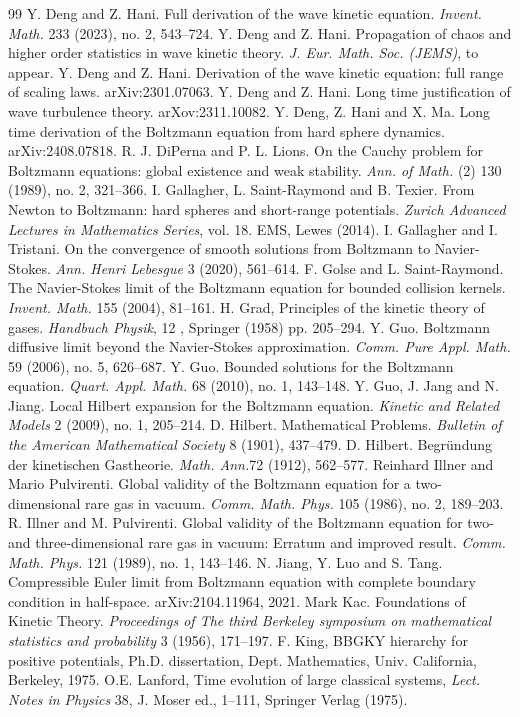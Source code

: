 \documentclass[10pt, reqno]{amsart}
\theoremstyle{definition}
\theoremstyle{remark}
\numberwithin{equation}{section}
\begin{document}
\begin{thebibliography}{99}
 Y. Deng and Z. Hani. Full derivation of the wave kinetic equation. \emph{Invent. Math.} 233 (2023), no. 2, 543--724.
 Y. Deng and Z. Hani. Propagation of chaos and higher order statistics in wave kinetic theory. \emph{J. Eur. Math. Soc. (JEMS)}, to appear.
 Y. Deng and Z. Hani. Derivation of the wave kinetic equation: full range of scaling laws. arXiv:2301.07063.
 Y. Deng and Z. Hani. Long time justification of wave turbulence theory. arXov:2311.10082.
 Y. Deng, Z. Hani and X. Ma. Long time derivation of the Boltzmann equation from hard sphere dynamics. arXiv:2408.07818.
 R. J. DiPerna and P. L. Lions. On the Cauchy problem for Boltzmann equations: global existence and weak stability. \emph{Ann. of Math.} (2) 130 (1989), no. 2, 321--366.
 I. Gallagher, L. Saint-Raymond and B. Texier. From Newton to Boltzmann: hard spheres and short-range potentials. \emph{Zurich Advanced Lectures in Mathematics Series}, vol. 18. EMS, Lewes (2014).
 I. Gallagher and I. Tristani. On the convergence of smooth solutions from Boltzmann to Navier-Stokes. \emph{Ann. Henri Lebesgue} 3 (2020), 561--614.
 F. Golse and L. Saint-Raymond. The Navier-Stokes limit of the Boltzmann equation for bounded collision kernels. \emph{Invent. Math.} 155 (2004), 81--161.
 H. Grad, Principles of the kinetic theory of gases. \emph{Handbuch Physik}, 12 , Springer (1958) pp. 205--294.
 Y. Guo. Boltzmann diffusive limit beyond the Navier-Stokes approximation. \emph{Comm. Pure Appl. Math.} 59 (2006), no. 5, 626--687.
 Y. Guo. Bounded solutions for the Boltzmann equation. \emph{Quart. Appl. Math.} 68 (2010), no. 1, 143--148.
 Y. Guo, J. Jang and N. Jiang. Local Hilbert expansion for the Boltzmann equation. \emph{Kinetic and Related Models} 2 (2009), no. 1, 205--214.
 D. Hilbert. Mathematical Problems. \emph{Bulletin of the American Mathematical Society} 8 (1901), 437--479.
 D. Hilbert. Begr\"undung der kinetischen Gastheorie.\emph{ Math. Ann.}72 (1912), 562--577.
 Reinhard Illner and Mario Pulvirenti. Global validity of the Boltzmann equation for a two-dimensional rare gas in vacuum. \emph{Comm. Math. Phys.} 105 (1986), no. 2, 189--203.
 R. Illner and M. Pulvirenti. Global validity of the Boltzmann equation for two- and three-dimensional rare gas in vacuum: Erratum and improved result. \emph{Comm. Math. Phys.} 121 (1989), no. 1, 143--146.
 N. Jiang, Y. Luo and S. Tang. Compressible Euler limit from Boltzmann equation with complete boundary condition in half-space. arXiv:2104.11964, 2021.
 Mark Kac. Foundations of Kinetic Theory. \emph{Proceedings of The third Berkeley symposium on mathematical statistics and probability} 3 (1956), 171--197.
 F. King, BBGKY hierarchy for positive potentials, Ph.D. dissertation, Dept. Mathematics, Univ. California, Berkeley, 1975.
 O.E. Lanford, Time evolution of large classical systems, \emph{Lect. Notes in Physics} 38, J. Moser ed., 1--111, Springer Verlag (1975).


\end{thebibliography}
\end{document}

